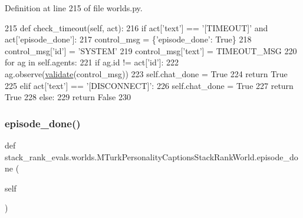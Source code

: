 Definition at line 215 of file worlds.\+py.


\begin{DoxyCode}
215     \textcolor{keyword}{def }check\_timeout(self, act):
216         \textcolor{keywordflow}{if} act[\textcolor{stringliteral}{'text'}] == \textcolor{stringliteral}{'[TIMEOUT]'} \textcolor{keywordflow}{and} act[\textcolor{stringliteral}{'episode\_done'}]:
217             control\_msg = \{\textcolor{stringliteral}{'episode\_done'}: \textcolor{keyword}{True}\}
218             control\_msg[\textcolor{stringliteral}{'id'}] = \textcolor{stringliteral}{'SYSTEM'}
219             control\_msg[\textcolor{stringliteral}{'text'}] = TIMEOUT\_MSG
220             \textcolor{keywordflow}{for} ag \textcolor{keywordflow}{in} self.agents:
221                 \textcolor{keywordflow}{if} ag.id != act[\textcolor{stringliteral}{'id'}]:
222                     ag.observe(\hyperlink{namespaceparlai_1_1core_1_1worlds_afc3fad603b7bce41dbdc9cdc04a9c794}{validate}(control\_msg))
223             self.chat\_done = \textcolor{keyword}{True}
224             \textcolor{keywordflow}{return} \textcolor{keyword}{True}
225         \textcolor{keywordflow}{elif} act[\textcolor{stringliteral}{'text'}] == \textcolor{stringliteral}{'[DISCONNECT]'}:
226             self.chat\_done = \textcolor{keyword}{True}
227             \textcolor{keywordflow}{return} \textcolor{keyword}{True}
228         \textcolor{keywordflow}{else}:
229             \textcolor{keywordflow}{return} \textcolor{keyword}{False}
230 
\end{DoxyCode}
\mbox{\label{classstack__rank__evals_1_1worlds_1_1MTurkPersonalityCaptionsStackRankWorld_ac1e7487bde15df0e0dafd706495a9d10}} 
\subsubsection{\texorpdfstring{episode\+\_\+done()}{episode\_done()}}
{\footnotesize\ttfamily def stack\+\_\+rank\+\_\+evals.\+worlds.\+M\+Turk\+Personality\+Captions\+Stack\+Rank\+World.\+episode\+\_\+done (\begin{DoxyParamCaption}\item[{}]{self }\end{DoxyParamCaption})}



